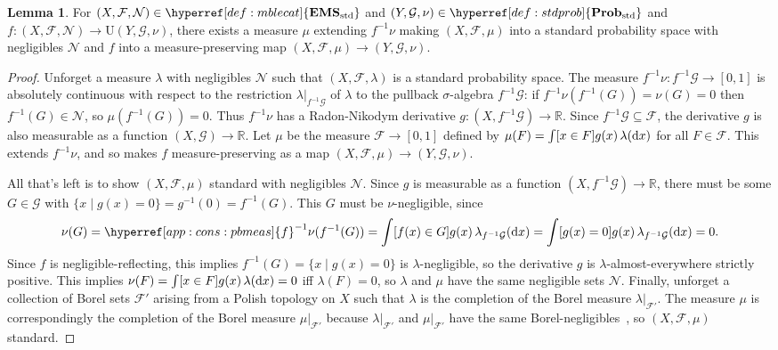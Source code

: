 \documentclass[
  sigconf,
  screen, ]{acmart}
\theoremstyle{definition}
\newtheorem{lemma}[theorem]{Lemma}
\newcommand\calF{\mathcal F}
\newcommand\calG{\mathcal G}
\newcommand\calN{\mathcal N}
\newcommand\R{\mathbb R}
\newcommand\fremlinf[3]{\cite[\href{https://www1.essex.ac.uk/maths/people/fremlin/chap#2.pdf\#page=#3}{#1}]{fremlin2000measure}}
\newcommand\nref[2]{\hyperref[#1]{#2}} \newcommand\checkhigh{{\huge{\color{red}\textbf{TODO: check}}}}
\newcommand\texforgetmu{\mathrm{U}}
\newcommand\forgetmu{{\nref{def:forgetmu}{\texforgetmu}}}
\newcommand\pbmeas[2]{{\nref{app:cons:pbmeas}{#1}^{-1}}#2}
\newcommand\texStdProb{\mathbf{Prob}_{\rm std}}
\newcommand\StdProb{{\nref{def:stdprob}{\texStdProb}}}
\newcommand\texStdMble{\mathbf{EMS}_{\rm std}}
\newcommand\StdMble{{\nref{def:mblecat}{\texStdMble}}}
\begin{document}
\begin{lemma} \label{app:lem:stdext}
  For $(X,\calF,\calN)\in\StdMble$
  and $(Y,\calG,\nu)\in\StdProb$ and
  $f : (X,\calF,\calN)\to \forgetmu(Y,\calG,\nu)$,
  there exists a measure $\mu$ extending $\pbmeas f \nu$
  making $(X,\calF,\mu)$ into a standard probability space
  with negligibles $\calN$
  and $f$ into a measure-preserving
  map $(X,\calF,\mu)\to (Y,\calG,\nu)$.
\end{lemma}
\begin{proof}
  Unforget a measure $\lambda$ with negligibles $\calN$
  such that $(X,\calF,\lambda)$ is a standard probability space.
  The measure $\pbmeas f\nu : f^{-1}\calG\to[0,1]$
  is absolutely continuous with respect to
  the restriction $\lambda|_{f^{-1}\calG}$
  of $\lambda$ to the pullback $\sigma$-algebra $f^{-1}\calG$:
  if $\pbmeas f\nu(f^{-1}(G)) =\nu(G) = 0$
  then $f^{-1}(G)\in\calN$, so $\mu(f^{-1}(G)) = 0$.
  Thus $\pbmeas f\nu$ has a Radon-Nikodym derivative
  $g : (X,f^{-1}\calG)\to \R$.
  Since $f^{-1}\calG\subseteq\calF$,
  the derivative $g$ is also measurable as a function $(X,\calG)\to\R$.
  Let $\mu$ be the measure $\calF\to[0,1]$
  defined by $\mu(F) = \int [x\in F]g(x)\,\lambda({\rm d}x)$
  for all $F\in\calF$.
  This extends $\pbmeas f\nu$, and so makes $f$ measure-preserving
  as a map $(X,\calF,\mu)\to(Y,\calG,\nu)$.

  All that's left is to show $(X,\calF,\mu)$ standard with negligibles $\calN$.
  Since $g$ is measurable as a function $(X,f^{-1}\calG)\to\R$,
  there must be some $G\in\calG$ with $\{x\mid g(x) = 0\} = g^{-1}(0) = f^{-1}(G)$.
  This $G$ must be $\nu$-negligible, since
  \[\nu(G) = \pbmeas f\nu(f^{-1}(G))
  = \int [f(x)\in G] g(x) \,\lambda_{f^{-1}\calG}({\rm d}x) 
  = \int [g(x) = 0] g(x) \,\lambda_{f^{-1}\calG}({\rm d}x) 
  = 0.\]
  Since $f$ is negligible-reflecting, this implies $f^{-1}(G) = \{x\mid g(x) = 0\}$
  is $\lambda$-negligible, so the derivative $g$ is $\lambda$-almost-everywhere
  strictly positive.
  This implies $\nu(F) = \int [x\in F]g(x)\,\lambda({\rm d}x) = 0$
  iff $\lambda(F) = 0$, so
  $\lambda$ and $\mu$ have the same negligible sets $\calN$.
  Finally, unforget a collection of Borel sets $\calF'$
  arising from a Polish topology on $X$ such that $\lambda$
  is the completion of the Borel measure $\lambda|_{\calF'}$.
  The measure $\mu$ is correspondingly the completion of the Borel measure
  $\mu|_{\calF'}$ because $\lambda|_{\calF'}$ and $\mu|_{\calF'}$
  have the same Borel-negligibles~\fremlinf{212E(d)}{21}{11},
  so $(X,\calF,\mu)$ standard.
\end{proof}
\end{document}
